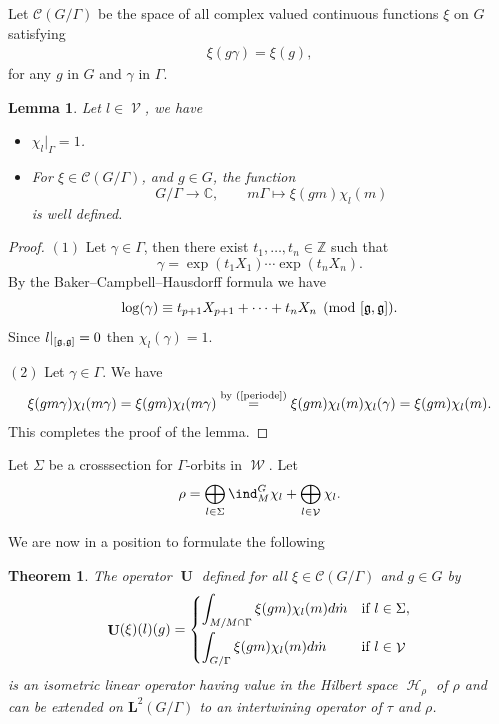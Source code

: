 \documentclass[11pt]{article}
\newtheorem{theorem}{Theorem}
\newtheorem{lemma}{Lemma}
\providecommand{\mathds}[1]{\mathbb{#1}}
\DeclareMathOperator{\U}{\mathbf{U}}
\DeclareMathOperator{\nongen}{\mathcal{V}}
\DeclareMathOperator{\gen}{\mathcal{W}}
\DeclareMathOperator{\Hi}{\mathscr{H}}
\def\dsc{{\mathds C}}
\def\dsz{{\mathds Z}}
\begin{document}
Let $\mathcal{C}(G/\Gamma)$ be the space of all complex valued
continuous functions $\xi$ on $G$ satisfying
\begin{gather}\label{periode}
\xi(g\gamma)= \xi(g), \end{gather}
 for any $g$ in $G$ and $\gamma$
in $\Gamma$.




\begin{lemma}\label{periode2} Let $l\in \nongen$, we have
\begin{itemize}\itemsep=0pt
  \item[$(1)$] $\chi_l\vert_{\Gamma}=1$.
  \item[$(2)$] For $\xi \in \mathcal{C}(G/\Gamma)$, and $g\in G$, the function
\[
G/\Gamma\rightarrow \dsc,\qquad m\Gamma\mapsto \xi(gm)
\chi_l(m)
\]
is well defined.
\end{itemize}
\end{lemma}

\begin{proof} $(1)$ Let $\gamma\in \Gamma$, then there exist
$t_1, \ldots, t_n\in \dsz$ such that
\[
\gamma=\exp(t_1X_1)\cdots \exp(t_nX_n).
\]
By the Baker--Campbell--Hausdorf\/f formula we have
\[
\log(\gamma)\equiv t_{p+1}X_{p+1}+\cdots+t_n X_n\pmod{[\frak g,
\frak g]}.
\]
 Since $l\vert_{[\frak g, \frak g]}=0$ then $\chi_l(\gamma)=1$.


$(2)$ Let $\gamma\in \Gamma$. We have
\begin{gather*}
 \xi(gm\gamma)
\chi_l(m\gamma)
   = \xi(gm)
\chi_l(m\gamma) \overset{\text{by (\ref{periode})}}{=}    \xi(gm) \chi_l(m) \chi_l(\gamma)
 = \xi(gm) \chi_l(m).
\end{gather*}
 This completes the proof of the lemma.
\end{proof}

Let $\Sigma$ be a crosssection for $\Gamma$-orbits in $\gen$. Let
\begin{gather*}
 \rho =   \bigoplus_{l \in \Sigma}\ind_M^G\chi_l +
\bigoplus_{l\in \nongen} \chi_l.
\end{gather*}


We are now in a position  to formulate the following

\begin{theorem}\label{des-operator-special}
The operator  $\U$ defined for all  $\xi\in \mathcal{C}(G/\Gamma)$
and $g\in G$ by
 \begin{gather*}%
 \U(\xi)(l)(g) = \begin{cases}
\displaystyle     \int_{M/M\cap \Gamma} \xi(gm) \chi_l(m) d\dot{m} & \mbox{if }  l\in \Sigma,\vspace{1mm}\\
\displaystyle     \int_{G/ \Gamma} \xi(gm) \chi_l(m) d\dot{m} & \mbox{if }  l\in \nongen
    \end{cases}
\end{gather*}
 is an isometric linear operator having value in the Hilbert space
 $\Hi_\rho$ of $\rho$  and can be extended on
  $\mathbf{L}^2(G/\Gamma)$ to an
intertwining operator of $\tau$ and $\rho$.
\end{theorem}
\end{document}
